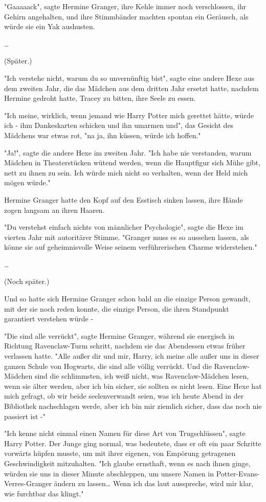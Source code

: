 {"Gaaaaack", sagte Hermine Granger, ihre Kehle immer noch verschlossen, ihr Gehirn angehalten, und ihre Stimmbänder machten spontan ein Geräusch, als würde sie ein Yak aushusten.

…

(Später.)

"Ich verstehe nicht, warum du so unvernünftig bist", sagte eine andere Hexe aus dem zweiten Jahr, die das Mädchen aus dem dritten Jahr ersetzt hatte, nachdem Hermine gedroht hatte, Tracey zu bitten, ihre Seele zu essen.

"Ich meine, wirklich, wenn jemand wie Harry Potter mich gerettet hätte, würde ich - ihm Dankeskarten schicken und ihn umarmen und", das Gesicht des Mädchens war etwas rot, "na ja, ihn küssen, würde ich hoffen."

"Ja!", sagte die andere Hexe im zweiten Jahr. "Ich habe nie verstanden, warum Mädchen in Theaterstücken wütend werden, wenn die Hauptfigur sich Mühe gibt, nett zu ihnen zu sein. Ich würde mich nicht so verhalten, wenn der Held mich mögen würde."

Hermine Granger hatte den Kopf auf den Esstisch sinken lassen, ihre Hände zogen langsam an ihren Haaren.

"Du verstehst einfach nichts von männlicher Psychologie", sagte die Hexe im vierten Jahr mit autoritärer Stimme. "Granger muss es so aussehen lassen, als könne sie auf geheimnisvolle Weise seinem verführerischen Charme widerstehen."

…

(Noch später.)

Und so hatte sich Hermine Granger schon bald an die einzige Person gewandt, mit der sie noch reden konnte, die einzige Person, die ihren Standpunkt garantiert verstehen würde -

"Die sind alle verrückt", sagte Hermine Granger, während sie energisch in Richtung Ravenclaw-Turm schritt, nachdem sie das Abendessen etwas früher verlassen hatte. "Alle außer dir und mir, Harry, ich meine alle außer uns in dieser ganzen Schule von Hogwarts, die sind alle völlig verrückt. Und die Ravenclaw-Mädchen sind die schlimmsten, ich weiß nicht, was Ravenclaw-Mädchen lesen, wenn sie älter werden, aber ich bin sicher, sie sollten es nicht lesen. Eine Hexe hat mich gefragt, ob wir beide seelenverwandt seien, was ich heute Abend in der Bibliothek nachschlagen werde, aber ich bin mir ziemlich sicher, dass das noch nie passiert ist -"

"Ich kenne nicht einmal einen Namen für diese Art von Trugschlüssen", sagte Harry Potter. Der Junge ging normal, was bedeutete, dass er oft ein paar Schritte vorwärts hüpfen musste, um mit ihrer eigenen, von Empörung getragenen Geschwindigkeit mitzuhalten. "Ich glaube ernsthaft, wenn es nach ihnen ginge, würden sie uns in dieser Minute abschleppen, um unsere Namen in Potter-Evans-Verres-Granger ändern zu lassen… Wenn ich das laut ausspreche, wird mir klar, wie furchtbar das klingt."

}
